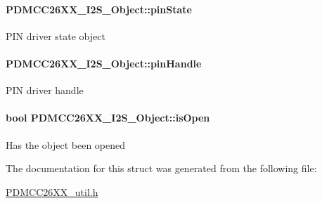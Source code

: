 \paragraph[{pin\+State}]{ P\+D\+M\+C\+C26\+X\+X\+\_\+\+I2\+S\+\_\+\+Object\+::pin\+State}\label{struct_p_d_m_c_c26_x_x___i2_s___object_a369c473d24f32e961a4b9d5fe01620fb}
P\+I\+N driver state object 
\paragraph[{pin\+Handle}]{ P\+D\+M\+C\+C26\+X\+X\+\_\+\+I2\+S\+\_\+\+Object\+::pin\+Handle}\label{struct_p_d_m_c_c26_x_x___i2_s___object_a98840eae8f2530e3c263ab66f31c2d8e}
P\+I\+N driver handle 
\paragraph[{is\+Open}]{\setlength{\rightskip}{0pt plus 5cm}bool P\+D\+M\+C\+C26\+X\+X\+\_\+\+I2\+S\+\_\+\+Object\+::is\+Open}\label{struct_p_d_m_c_c26_x_x___i2_s___object_abea7f7d13e225bd7f9a036b78a5cd13c}
Has the object been opened 

The documentation for this struct was generated from the following file\+:\begin{DoxyCompactItemize}
\item 
\hyperlink{_p_d_m_c_c26_x_x__util_8h}{P\+D\+M\+C\+C26\+X\+X\+\_\+util.\+h}\end{DoxyCompactItemize}
